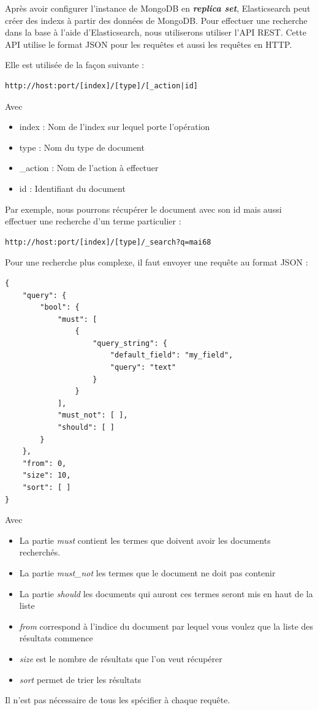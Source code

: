 Après avoir configurer l'instance de MongoDB en \textbf{\textit{replica set}}, Elasticsearch peut créer des indexs à partir des données de MongoDB.
Pour effectuer une recherche dans la base à l’aide d’Elasticsearch, nous utiliserons utiliser l’API REST. Cette API utilise le format JSON pour les requêtes et aussi les requêtes en HTTP.


Elle est utilisée de la façon suivante :
\begin{verbatim}
http://host:port/[index]/[type]/[_action|id]
\end{verbatim}
Avec

\begin{itemize}
	\item index : Nom de l’index sur lequel porte l’opération
	\item type : Nom du type de document
	\item \_action : Nom de l’action à effectuer
	\item id : Identifiant du document
\end{itemize}


Par exemple, nous pourrons récupérer le document avec son id mais aussi effectuer une recherche d’un terme particulier :
\begin{verbatim}
http://host:port/[index]/[type]/_search?q=mai68
\end{verbatim}

Pour une recherche plus complexe, il faut envoyer une requête au format JSON :

\begin{verbatim}
{
    "query": {
        "bool": {
            "must": [
                {
                    "query_string": {
                        "default_field": "my_field",
                        "query": "text"
                    }
                }
            ],
            "must_not": [ ],
            "should": [ ]
        }
    },
    "from": 0,
    "size": 10,
    "sort": [ ]
}
\end{verbatim}

Avec
\begin{itemize}
	\item La partie \textit{must} contient les termes que doivent avoir les documents recherchés.
	\item La partie \textit{must\_not} les termes que le document ne doit pas contenir
	\item La partie \textit{should} les documents qui auront ces termes seront mis en haut de la liste
	\item \textit{from} correspond à l'indice du document par lequel vous voulez que la liste des résultats commence
	\item \textit {size} est le nombre de résultats que l'on veut récupérer
	\item \textit{sort} permet de trier les résultats
\end{itemize}
Il n'est pas nécessaire de tous les spécifier à chaque requête.


